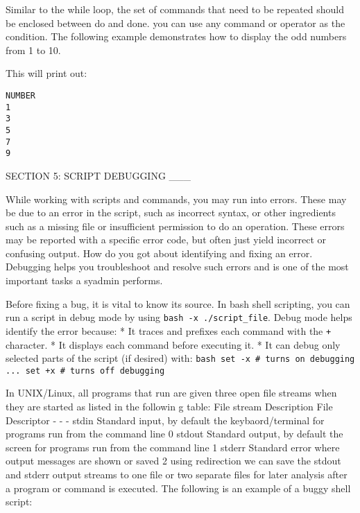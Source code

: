 Similar to the while loop, the set of commands that need to be repeated
should be enclosed between do and done. you can use any command or
operator as the condition. The following example demonstrates how to
display the odd numbers from 1 to 10.

\begin{Shaded}
\begin{Highlighting}[]
\CommentTok{#}
 
\KeywordTok{until [}   \KeywordTok{ ]}
   
   \OtherTok{))}
\end{Highlighting}
\end{Shaded}

This will print out:

\begin{verbatim}
NUMBER
1
3
5
7
9
\end{verbatim}

SECTION 5: SCRIPT DEBUGGING \_\_\_

While working with scripts and commands, you may run into errors. These
may be due to an error in the script, such as incorrect syntax, or other
ingredients such as a missing file or insufficient permission to do an
operation. These errors may be reported with a specific error code, but
often just yield incorrect or confusing output. How do you got about
identifying and fixing an error. Debugging helps you troubleshoot and
resolve such errors and is one of the most important tasks a syadmin
performs.

Before fixing a bug, it is vital to know its source. In bash shell
scripting, you can run a script in debug mode by using
\texttt{bash -x ./script\_file}. Debug mode helps identify the error
because: * It traces and prefixes each command with the \texttt{+}
character. * It displays each command before executing it. * It can
debug only selected parts of the script (if desired) with:
\texttt{bash   set -x \# turns on debugging   ...   set +x \# turns off debugging}

In UNIX/Linux, all programs that run are given three open file streams
when they are started as listed in the followin g table: File stream
\textbar{} Description \textbar{} File Descriptor - \textbar{} -
\textbar{} - stdin \textbar{} Standard input, by default the
keybaord/terminal for programs run from the command line \textbar{} 0
stdout \textbar{} Standard output, by default the screen for programs
run from the command line \textbar{} 1 stderr \textbar{} Standard error
where output messages are shown or saved \textbar{} 2 using redirection
we can save the stdout and stderr output streams to one file or two
separate files for later analysis after a program or command is
executed. The following is an example of a buggy shell script:

